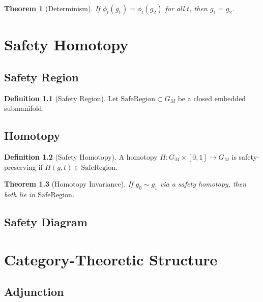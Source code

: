 \documentclass[11pt,oneside]{memoir}
\theoremstyle{definition}
\newtheorem{definition}{Definition}[chapter]
\theoremstyle{plain}
\newtheorem{theorem}[definition]{Theorem}
\theoremstyle{remark}
\begin{document}
\begin{theorem}[Determinism]
If $\phi_t(g_1) = \phi_t(g_2)$ for all $t$, then $g_1 = g_2$.
\end{theorem}

\chapter{Safety Homotopy}

\section{Safety Region}

\begin{definition}[Safety Region]
Let $\mathrm{SafeRegion} \subset G_M$ be a closed embedded submanifold.
\end{definition}

\section{Homotopy}

\begin{definition}[Safety Homotopy]
A homotopy $H : G_M \times [0,1] \to G_M$ is safety-preserving if 
$H(g,t) \in \mathrm{SafeRegion}$.
\end{definition}

\begin{theorem}[Homotopy Invariance]
If $g_0 \sim g_1$ via a safety homotopy, then both lie in $\mathrm{SafeRegion}$.
\end{theorem}

\section{Safety Diagram}

\begin{center}
\end{center}

\chapter{Category-Theoretic Structure}

\section{Adjunction}
\end{document}
